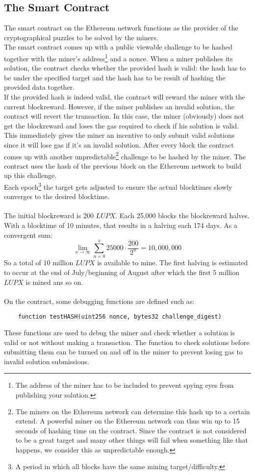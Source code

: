 \documentclass{article}
\begin{document}
\subsection{The Smart Contract}
The smart contract on the Ethereum network functions as the provider of the cryptographical puzzles to be solved by the miners. \\
The smart contract comes up with a public viewable challenge to be hashed together with the miner's address\footnote{The address of the miner has to be included to prevent spying eyes from publishing your solution.} and a nonce. When a miner publishes its solution, the contract checks whether the provided hash is valid: the hash has to be under the specified target and the hash has to be result of hashing the provided data together. \\
If the provided hash is indeed valid, the contract will reward the miner with the current blockreward. However, if the miner publishes an invalid solution, the contract will revert the transaction. In this case, the miner (obviously) does not get the blockreward and loses the gas required to check if his solution is valid. This immediately gives the miner an incentive to only submit valid solutions since it will lose gas if it's an invalid solution. After every block the contract comes up with another unpredictable\footnote{The miners on the Ethereum network can determine this hash up to a certain extend. A powerful miner on the Ethereum network can thus win up to 15 seconds of hashing time on the contract. Since the contract is not considered to be a great target and many other things will fail when something like that happens, we consider this as unpredictable enough.} challenge to be hashed by the miner. The contract uses the hash of the previous block on the Ethereum network to build up this challenge. \\
Each epoch\footnote{A period in which all blocks have the same mining target/difficulty.} the target gets adjusted to ensure the actual blocktimes slowly converges to the desired blocktime. \\
\\
The initial blockreward is 200 $LUPX$. Each 25,000 blocks the blockreward halves. With a blocktime of 10 minutes, that results in a halving each 174 days. As a convergent sum: $$\lim_{x\to\infty} \sum_{n=0}^{x} 25000 \cdot \frac{200}{2^n} = 10,000,000$$ So a total of 10 million $LUPX$ is available to mine. The first halving is estimated to occur at the end of July/beginning of August after which the first 5 million $LUPX$ is mined ans so on. \\ \\
On the contract, some debugging functions are defined such as: \begin{verbatim}
    function testHASH(uint256 nonce, bytes32 challenge_digest)
\end{verbatim}  
These functions are used to debug the miner and check whether a solution is valid or not without making a transaction. The function to check solutions before submitting them can be turned on and off in the miner to prevent losing gas to invalid solution submissions.
\end{document}

